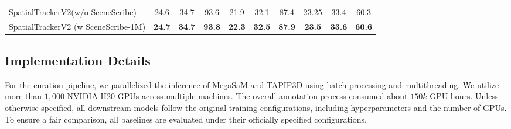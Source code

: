 \begin{table}[!t]
\begin{minipage}[t]{.49\textwidth}
{{\begin{tabular}{lccccccccc}
                \midrule
                SpatialTrackerV2(w/o SceneScribe) & 24.6  & 34.7  & 93.6  & 21.9  & 32.1  & 87.4  & 23.25 & 33.4  & 60.3 \\
                SpatialTrackerV2 (w SceneScribe-1M) & \textbf{24.7} & \textbf{34.7} & \textbf{93.8} & \textbf{22.3} & \textbf{32.5} & \textbf{87.9} & \textbf{23.5} & \textbf{33.6} & \textbf{60.6} \\
                \bottomrule
                \end{tabular}
            }
        }
    \end{minipage}
       \vspace{-0.3cm}
    \label{tab::track}
\end{table}


\begin{table}[!t]
  \centering
  \caption{\textbf{Text/Pose-to-Video Evaluation on RealEstate10K~\cite{zhou2018stereo}}.}
     \vspace{-0.2cm}
  \label{tab:ac3d}%
   \vspace{-0.6cm}
\end{table}%


\subsection{Implementation Details}
 For the curation pipeline, 
 we parallelized the inference of MegaSaM and TAPIP3D using batch processing and multithreading.
 We utilize more than $1,000$ NVIDIA H20 GPUs across multiple machines. The overall annotation process consumed about $150k$ GPU hours.
Unless otherwise specified, all downstream models follow the original training configurations, including hyperparameters and the number of GPUs. To ensure a fair comparison, all baselines are evaluated under their officially specified configurations.








